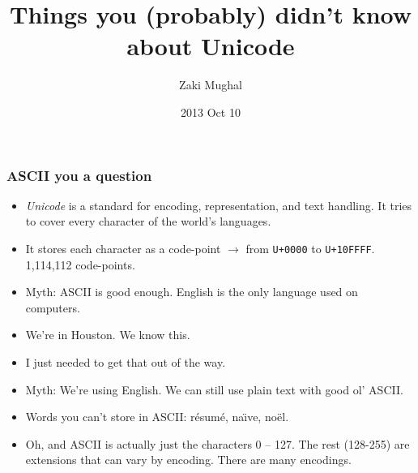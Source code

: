 \documentclass[%
        hyperref={%
                pdfauthor={Zakariyya Mughal},%
                pdfpagemode={None},pdfpagelayout={SinglePage}}%
        xcolor={x11names},%
]{beamer}
\title[Unicode]{Things you (probably) didn't know about Unicode}
\author{Zaki Mughal}
\institute{University of Houston:\\CougarCS}
\date{2013 Oct 10}
\begin{document}
\frame{\titlepage}


\begin{frame}
\frametitle{ASCII you a question}
\begin{center}
\begin{minipage}{0.5\textwidth}

\end{minipage}
\end{center}
\end{frame}

\begin{frame}
\begin{itemize}
\item \emph{Unicode} is a standard for encoding, representation, and text
handling. It tries to cover every character of the world's
languages.

\pause\item It stores each character as a code-point $\rightarrow$  from \texttt{U+0000}
to \texttt{U+10FFFF}. 1,114,112 code-points.
\end{itemize}
\end{frame}

\begin{frame}
\begin{itemize}
\frametitle{Myths}
\item Myth: ASCII is good enough. English is the only language used on computers.
\pause\item We're in Houston. We know this.
\pause\item I just needed to get that out of the way.
\end{itemize}
\end{frame}

\begin{frame}
\begin{itemize}
\item Myth: We're using English. We can still use plain text with good ol' ASCII.
\item Words you can't store in ASCII: r\'esum\'e, na\"{\i}ve, no\"el.
\pause\item Oh, and ASCII is actually just the characters 0 --
127. The rest (128-255) are extensions that can vary by encoding. \pause
There are many encodings.
\end{itemize}
\end{frame}
\end{document}
